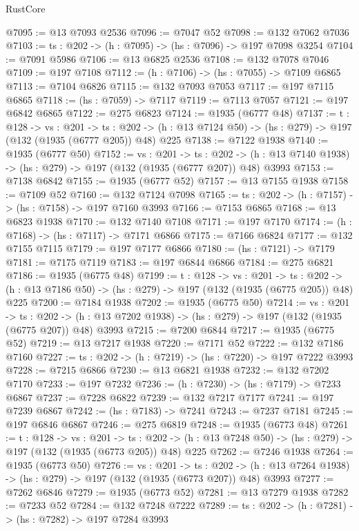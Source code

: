 \begin{lexlean}{RustCore}
\begin{coremodule}
@7095 := @13 @7093 @2536
@7096 := @7047 @52
@7098 := @132 @7062 @7036
@7103 := {ts : @202} -> (h : @7095) -> (hs : @7096) -> @197 @7098 @3254
@7104 := @7091 @5986
@7106 := @13 @6825 @2536
@7108 := @132 @7078 @7046
@7109 := @197 @7108
@7112 := (h : @7106) -> (hs : @7055) -> @7109 @6865
@7113 := @7104 @6826
@7115 := @132 @7093 @7053
@7117 := @197 @7115 @6865
@7118 := (hs : @7059) -> @7117
@7119 := @7113 @7057
@7121 := @197 @6842 @6865
@7122 := @275 @6823
@7124 := @1935 (@6777 @48)
@7137 := {t : @128} ->
  {vs : @201} ->
  {ts : @202} -> (h : @13 @7124 @50) -> (hs : @279) -> @197 (@132 (@1935 (@6777 @205)) @48) @225
@7138 := @7122 @1938
@7140 := @1935 (@6777 @50)
@7152 := {vs : @201} ->
  {ts : @202} -> (h : @13 @7140 @1938) -> (hs : @279) -> @197 (@132 (@1935 (@6777 @207)) @48) @3993
@7153 := @7138 @6842
@7155 := @1935 (@6777 @52)
@7157 := @13 @7155 @1938
@7158 := @7109 @52
@7160 := @132 @7124 @7098
@7165 := {ts : @202} -> (h : @7157) -> (hs : @7158) -> @197 @7160 @3993
@7166 := @7153 @6865
@7168 := @13 @6823 @1938
@7170 := @132 @7140 @7108
@7171 := @197 @7170
@7174 := (h : @7168) -> (hs : @7117) -> @7171 @6866
@7175 := @7166 @6824
@7177 := @132 @7155 @7115
@7179 := @197 @7177 @6866
@7180 := (hs : @7121) -> @7179
@7181 := @7175 @7119
@7183 := @197 @6844 @6866
@7184 := @275 @6821
@7186 := @1935 (@6775 @48)
@7199 := {t : @128} ->
  {vs : @201} ->
  {ts : @202} -> (h : @13 @7186 @50) -> (hs : @279) -> @197 (@132 (@1935 (@6775 @205)) @48) @225
@7200 := @7184 @1938
@7202 := @1935 (@6775 @50)
@7214 := {vs : @201} ->
  {ts : @202} -> (h : @13 @7202 @1938) -> (hs : @279) -> @197 (@132 (@1935 (@6775 @207)) @48) @3993
@7215 := @7200 @6844
@7217 := @1935 (@6775 @52)
@7219 := @13 @7217 @1938
@7220 := @7171 @52
@7222 := @132 @7186 @7160
@7227 := {ts : @202} -> (h : @7219) -> (hs : @7220) -> @197 @7222 @3993
@7228 := @7215 @6866
@7230 := @13 @6821 @1938
@7232 := @132 @7202 @7170
@7233 := @197 @7232
@7236 := (h : @7230) -> (hs : @7179) -> @7233 @6867
@7237 := @7228 @6822
@7239 := @132 @7217 @7177
@7241 := @197 @7239 @6867
@7242 := (hs : @7183) -> @7241
@7243 := @7237 @7181
@7245 := @197 @6846 @6867
@7246 := @275 @6819
@7248 := @1935 (@6773 @48)
@7261 := {t : @128} ->
  {vs : @201} ->
  {ts : @202} -> (h : @13 @7248 @50) -> (hs : @279) -> @197 (@132 (@1935 (@6773 @205)) @48) @225
@7262 := @7246 @1938
@7264 := @1935 (@6773 @50)
@7276 := {vs : @201} ->
  {ts : @202} -> (h : @13 @7264 @1938) -> (hs : @279) -> @197 (@132 (@1935 (@6773 @207)) @48) @3993
@7277 := @7262 @6846
@7279 := @1935 (@6773 @52)
@7281 := @13 @7279 @1938
@7282 := @7233 @52
@7284 := @132 @7248 @7222
@7289 := {ts : @202} -> (h : @7281) -> (hs : @7282) -> @197 @7284 @3993

\end{coremodule}
\end{lexlean}
